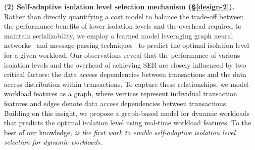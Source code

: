 \textbf{(2) Self-adaptive isolation level selection mechanism (\S\ref{design-2}).} 
% 
Rather than directly quantifying a cost model to balance the trade-off between the performance benefits of lower isolation levels and the overhead required to maintain serializability, we employ a learned model leveraging graph neural networks~\cite{DBLP:journals/corr/BrunaZSL13} and message-passing techniques~\cite{DBLP:conf/icml/GilmerSRVD17} to predict the optimal isolation level for a given workload.
Our observations reveal that the performance of various isolation levels and the overhead of achieving SER are closely influenced by two critical factors: the data access dependencies between transactions and the data access distribution within transactions. To capture these relationships, we model workload features as a graph, where vertices represent individual transaction features and edges denote data access dependencies between transactions.
Building on this insight, we propose a graph-based model for dynamic workloads that predicts the optimal isolation level using real-time workload features.
To the best of our knowledge, \textit{\sysname is the first work to enable self-adaptive isolation level selection for dynamic workloads.}

